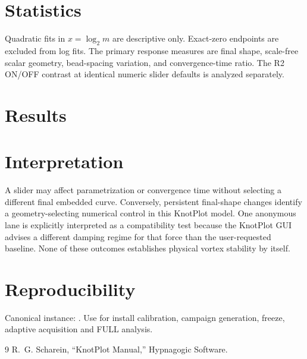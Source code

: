 \documentclass[11pt,a4paper]{article}
\begin{document}
\section{Statistics}
Quadratic fits in $x=\log_2m$ are descriptive only. Exact-zero endpoints are excluded from log fits. The primary response measures are final shape, scale-free scalar geometry, bead-spacing variation, and convergence-time ratio. The R2 ON/OFF contrast at identical numeric slider defaults is analyzed separately.
\section{Results}
\section{Interpretation}
A slider may affect parametrization or convergence time without selecting a different final embedded curve. Conversely, persistent final-shape changes identify a geometry-selecting numerical control in this KnotPlot model. One anonymous lane is explicitly interpreted as a compatibility test because the KnotPlot GUI advises a different damping regime for that force than the user-requested baseline. None of these outcomes establishes physical vortex stability by itself.
\section{Reproducibility}
Canonical instance: . Use  for install calibration, campaign generation, freeze, adaptive acquisition and FULL analysis.
\begin{thebibliography}{9}
 R.~G. Scharein, ``KnotPlot Manual,'' Hypnagogic Software.
\end{thebibliography}
\end{document}
